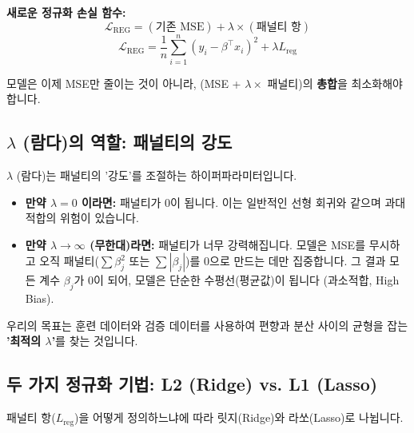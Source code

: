 \documentclass[11pt,a4paper]{book}
\theoremstyle{definition}
\begin{document}
\textbf{새로운 정규화 손실 함수:}
$$
\mathcal{L}_{\text{REG}} = (\text{기존 MSE}) + \lambda \times (\text{패널티 항})
$$
$$
\mathcal{L}_{\text{REG}} = \frac{1}{n}\sum_{i=1}^{n}(y_i - \beta^{\top}x_i)^2 + \lambda L_{\text{reg}}
$$

모델은 이제 MSE만 줄이는 것이 아니라, (MSE + $\lambda \times$ 패널티)의 \textbf{총합}을 최소화해야 합니다.

\subsection{$\lambda$ (람다)의 역할: 패널티의 강도}

$\lambda$ (람다)는 패널티의 '강도'를 조절하는 하이퍼파라미터입니다.

\begin{itemize}
    \item \textbf{만약 $\lambda = 0$ 이라면:}
        패널티가 0이 됩니다. 이는 일반적인 선형 회귀와 같으며 과대적합의 위험이 있습니다.
    \item \textbf{만약 $\lambda \rightarrow \infty$ (무한대)라면:}
        패널티가 너무 강력해집니다. 모델은 MSE를 무시하고 오직 패널티($\sum \beta_j^2$ 또는 $\sum |\beta_j|$)를 0으로 만드는 데만 집중합니다. 그 결과 모든 계수 $\beta_j$가 0이 되어, 모델은 단순한 수평선(평균값)이 됩니다 (과소적합, High Bias).
\end{itemize}

\begin{summarybox}
우리의 목표는 훈련 데이터와 검증 데이터를 사용하여 편향과 분산 사이의 균형을 잡는 \textbf{'최적의 $\lambda$'}를 찾는 것입니다.
\end{summarybox}

\subsection{두 가지 정규화 기법: L2 (Ridge) vs. L1 (Lasso)}

패널티 항($L_{\text{reg}}$)을 어떻게 정의하느냐에 따라 릿지(Ridge)와 라쏘(Lasso)로 나뉩니다.
\end{document}
